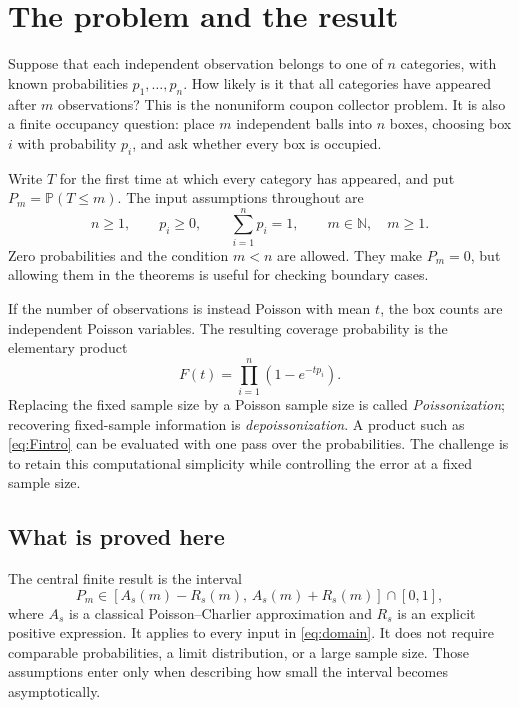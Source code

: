\documentclass[11pt,a4paper]{article}
\theoremstyle{definition}
\newcommand{\Prb}{\mathbb P}
\newcommand{\N}{\mathbb N}
\begin{document}
\tableofcontents
\newpage

\section{The problem and the result}\label{sec:introduction}

Suppose that each independent observation belongs to one of $n$ categories,
with known probabilities $p_1,\ldots,p_n$. How likely is it that all
categories have appeared after $m$ observations? This is the nonuniform
coupon collector problem. It is also a finite occupancy question: place
$m$ independent balls into $n$ boxes, choosing box $i$ with probability
$p_i$, and ask whether every box is occupied.

Write $T$ for the first time at which every category has appeared, and put
$P_m=\Prb(T\le m)$. The input assumptions throughout are
\begin{equation}\label{eq:domain}
 n\ge1,\qquad p_i\ge0,\qquad \sum_{i=1}^n p_i=1,
 \qquad m\in\N,\quad m\ge1.
\end{equation}
Zero probabilities and the condition $m<n$ are allowed. They make $P_m=0$,
but allowing them in the theorems is useful for checking boundary cases.

If the number of observations is instead Poisson with mean $t$, the box
counts are independent Poisson variables. The resulting coverage probability
is the elementary product
\begin{equation}\label{eq:Fintro}
 F(t)=\prod_{i=1}^n(1-e^{-tp_i}).
\end{equation}
Replacing the fixed sample size by a Poisson sample size is called
\emph{Poissonization}; recovering fixed-sample information is
\emph{depoissonization}. A product such as \eqref{eq:Fintro} can be evaluated
with one pass over the probabilities. The challenge is to retain this
computational simplicity while controlling the error at a fixed sample size.

\subsection{What is proved here}

The central finite result is the interval
\begin{equation}\label{eq:introinterval}
 P_m\in[A_s(m)-R_s(m),\,A_s(m)+R_s(m)]\cap[0,1],
\end{equation}
where $A_s$ is a classical Poisson--Charlier approximation and $R_s$ is an
explicit positive expression. It applies to every input in
\eqref{eq:domain}. It does not require comparable probabilities, a limit
distribution, or a large sample size. Those assumptions enter only when
describing how small the interval becomes asymptotically.
\end{document}
